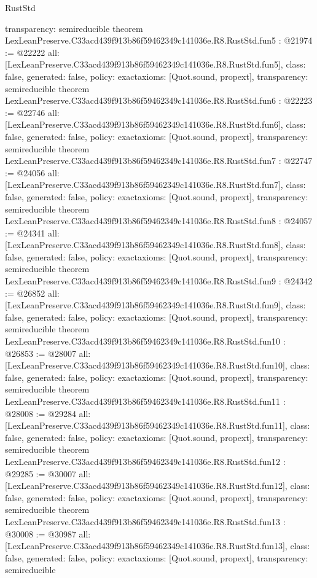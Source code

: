 \begin{lexlean}{RustStd}
\begin{coremodule}
{  transparency: semireducible
}
theorem LexLeanPreserve.C33acd439f913b86f59462349c141036e.R8.RustStd.fun5 : @21974 := @22222 {
  all: [LexLeanPreserve.C33acd439f913b86f59462349c141036e.R8.RustStd.fun5],
  class: false,
  generated: false,
  policy: exact{axioms: [Quot.sound, propext]},
  transparency: semireducible
}
theorem LexLeanPreserve.C33acd439f913b86f59462349c141036e.R8.RustStd.fun6 : @22223 := @22746 {
  all: [LexLeanPreserve.C33acd439f913b86f59462349c141036e.R8.RustStd.fun6],
  class: false,
  generated: false,
  policy: exact{axioms: [Quot.sound, propext]},
  transparency: semireducible
}
theorem LexLeanPreserve.C33acd439f913b86f59462349c141036e.R8.RustStd.fun7 : @22747 := @24056 {
  all: [LexLeanPreserve.C33acd439f913b86f59462349c141036e.R8.RustStd.fun7],
  class: false,
  generated: false,
  policy: exact{axioms: [Quot.sound, propext]},
  transparency: semireducible
}
theorem LexLeanPreserve.C33acd439f913b86f59462349c141036e.R8.RustStd.fun8 : @24057 := @24341 {
  all: [LexLeanPreserve.C33acd439f913b86f59462349c141036e.R8.RustStd.fun8],
  class: false,
  generated: false,
  policy: exact{axioms: [Quot.sound, propext]},
  transparency: semireducible
}
theorem LexLeanPreserve.C33acd439f913b86f59462349c141036e.R8.RustStd.fun9 : @24342 := @26852 {
  all: [LexLeanPreserve.C33acd439f913b86f59462349c141036e.R8.RustStd.fun9],
  class: false,
  generated: false,
  policy: exact{axioms: [Quot.sound, propext]},
  transparency: semireducible
}
theorem LexLeanPreserve.C33acd439f913b86f59462349c141036e.R8.RustStd.fun10 : @26853 := @28007 {
  all: [LexLeanPreserve.C33acd439f913b86f59462349c141036e.R8.RustStd.fun10],
  class: false,
  generated: false,
  policy: exact{axioms: [Quot.sound, propext]},
  transparency: semireducible
}
theorem LexLeanPreserve.C33acd439f913b86f59462349c141036e.R8.RustStd.fun11 : @28008 := @29284 {
  all: [LexLeanPreserve.C33acd439f913b86f59462349c141036e.R8.RustStd.fun11],
  class: false,
  generated: false,
  policy: exact{axioms: [Quot.sound, propext]},
  transparency: semireducible
}
theorem LexLeanPreserve.C33acd439f913b86f59462349c141036e.R8.RustStd.fun12 : @29285 := @30007 {
  all: [LexLeanPreserve.C33acd439f913b86f59462349c141036e.R8.RustStd.fun12],
  class: false,
  generated: false,
  policy: exact{axioms: [Quot.sound, propext]},
  transparency: semireducible
}
theorem LexLeanPreserve.C33acd439f913b86f59462349c141036e.R8.RustStd.fun13 : @30008 := @30987 {
  all: [LexLeanPreserve.C33acd439f913b86f59462349c141036e.R8.RustStd.fun13],
  class: false,
  generated: false,
  policy: exact{axioms: [Quot.sound, propext]},
  transparency: semireducible
}
\end{coremodule}
\end{lexlean}
